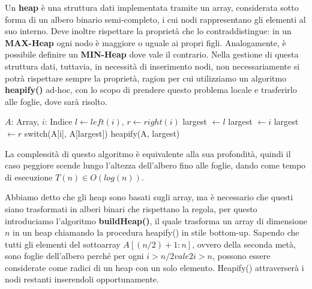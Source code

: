 \noindent Un \textbf{heap} è una struttura dati implementata tramite un array, considerata sotto forma di un albero binario semi-completo, i cui nodi rappresentano gli elementi al suo interno. Deve inoltre rispettare la proprietà che lo contraddistingue: in un \textbf{MAX-Heap} ogni nodo è maggiore o uguale ai propri figli. Analogamente, è possibile definire un \textbf{MIN-Heap} dove vale il contrario.
\noindent Nella gestione di questa struttura dati, tuttavia, in necessità di inserimento nodi, non necessariamente si potrà rispettare sempre la proprietà, ragion per cui utilizziamo un algoritmo \textbf{heapify()} ad-hoc, con lo scopo di prendere questo problema locale e trasferirlo alle foglie, dove sarà risolto.
\begin{algorithm}[H]
	\caption{heapify(A, i)}
	\begin{algorithmic}[1]
		\Require $A$: Array, $i$: Indice
		\State $l\gets left(i)$, $r\gets right(i)$ 
		\State
		 
		\State largest $\gets l$
		\Else 
		\State largest $\gets i$ 
		\EndIf
		\State
		 
		\State largest $\gets r$
		\EndIf
		\State
		 
		\State switch(A[i], A[largest]) 
		\State heapify(A, largest) 
		\EndIf
	\end{algorithmic}
\end{algorithm}
\noindent La complessità di questo algoritmo è equivalente alla sua profondità, quindi il caso peggiore scende lungo l'altezza dell'albero fino alle foglie, dando come tempo di esecuzione $T(n) \in O(log(n))$.\par
Abbiamo detto che gli heap sono basati sugli array, ma è necessario che questi siano trasformati in alberi binari che rispettano la regola, per questo introduciamo l'algoritmo \textbf{buildHeap()}, il quale trasforma un array di dimensione $n$ in un heap chiamando la procedura heapify() in stile bottom-up. Sapendo che tutti gli elementi del sottoarray $A[(n/2)+1:n]$, ovvero della seconda metà, sono foglie dell'albero perché per ogni $i > n/2 vale 2i > n$, possono essere considerate come radici di un heap con un solo elemento. Heapify() attraverserà i nodi restanti inserendoli opportunamente.
